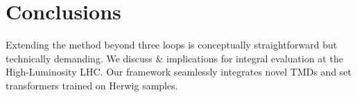 \section{Conclusions}\label{sec:conclusions}

Extending the method beyond three loops is conceptually straightforward
but technically demanding. We discuss & implications for integral
evaluation at the High-Luminosity LHC. Our framework seamlessly
integrates novel TMDs and set transformers trained on Herwig samples.

